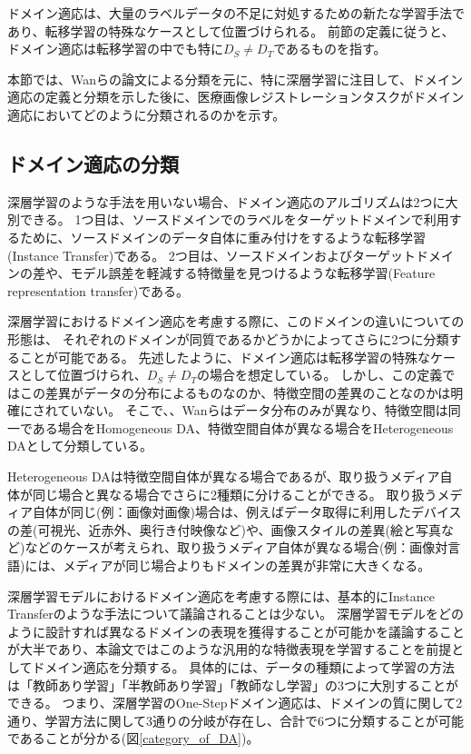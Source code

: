 

ドメイン適応は、大量のラベルデータの不足に対処するための新たな学習手法であり、転移学習の特殊なケースとして位置づけられる。
前節の定義に従うと、ドメイン適応は転移学習の中でも特に$D_S \neq D_T$であるものを指す。

本節では、Wanら\cite{wang2018deep}の論文による分類を元に、特に深層学習に注目して、ドメイン適応の定義と分類を示した後に、医療画像レジストレーションタスクがドメイン適応においてどのように分類されるのかを示す。

\subsection{ドメイン適応の分類}
    深層学習のような手法を用いない場合、ドメイン適応のアルゴリズムは2つに大別できる。
    1つ目は、ソースドメインでのラベルをターゲットドメインで利用するために、ソースドメインのデータ自体に重み付けをするような転移学習(Instance Transfer)である。
    2つ目は、ソースドメインおよびターゲットドメインの差や、モデル誤差を軽減する特徴量を見つけるような転移学習(Feature representation transfer)である。

    深層学習におけるドメイン適応を考慮する際に、このドメインの違いについての形態は、 それぞれのドメインが同質であるかどうかによってさらに2つに分類することが可能である。
    先述したように、ドメイン適応は転移学習の特殊なケースとして位置づけられ、$D_S \neq D_T$の場合を想定している。
    しかし、この定義ではこの差異がデータの分布によるものなのか、特徴空間の差異のことなのかは明確にされていない。
    そこで、、Wanら\cite{wang2018deep}はデータ分布のみが異なり、特徴空間は同一である場合をHomogeneous DA、特徴空間自体が異なる場合をHeterogeneous DAとして分類している。
    
    Heterogeneous DAは特徴空間自体が異なる場合であるが、取り扱うメディア自体が同じ場合と異なる場合でさらに2種類に分けることができる。
    取り扱うメディア自体が同じ(例：画像対画像)場合は、例えばデータ取得に利用したデバイスの差(可視光、近赤外、奥行き付映像など)や、画像スタイルの差異(絵と写真など)などのケースが考えられ、取り扱うメディア自体が異なる場合(例：画像対言語)には、メディアが同じ場合よりもドメインの差異が非常に大きくなる。

    深層学習モデルにおけるドメイン適応を考慮する際には、基本的にInstance Transferのような手法について議論されることは少ない。
    深層学習モデルをどのように設計すれば異なるドメインの表現を獲得することが可能かを議論することが大半であり、本論文ではこのような汎用的な特徴表現を学習することを前提としてドメイン適応を分類する。
    具体的には、データの種類によって学習の方法は「教師あり学習」「半教師あり学習」「教師なし学習」の3つに大別することができる。
    つまり、深層学習のOne-Stepドメイン適応は、ドメインの質に関して2通り、学習方法に関して3通りの分岐が存在し、合計で6つに分類することが可能であることが分かる(図\ref{category_of_DA})。
    
